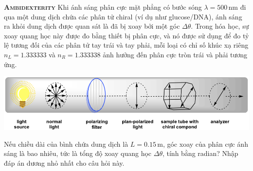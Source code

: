 \begin{problem}
{\textbf{\textsc{Ambidexterity}}}
Khi ánh sáng phân cực mặt phẳng có bước sóng \( \lambda = 500 \, \text{nm} \) đi qua một dung dịch chứa các phân tử chiral (ví dụ như glucose/DNA), ánh sáng ra khỏi dung dịch được quan sát là đã bị xoay bởi một góc \( \Delta \theta \). Trong hóa học, sự xoay quang học này được đo bằng thiết bị phân cực, và nó được sử dụng để đo tỷ lệ tương đối của các phân tử tay trái và tay phải, mỗi loại có chỉ số khúc xạ riêng \( n_L = 1.333333 \) và \( n_R = 1.333338 \) ảnh hưởng đến phân cực tròn trái và phải tương ứng.

\begin{center}
\includegraphics[width=.8\textwidth]{problems/figures/opticalRotationSchematic.png}
\end{center}

Nếu chiều dài của bình chứa dung dịch là \( L = 0.15 \, \text{m} \), góc xoay của phân cực ánh sáng là bao nhiêu, tức là tổng độ xoay quang học \( \Delta \theta \), tính bằng radian? Nhập đáp án dương nhỏ nhất cho câu hỏi này.
\end{problem}